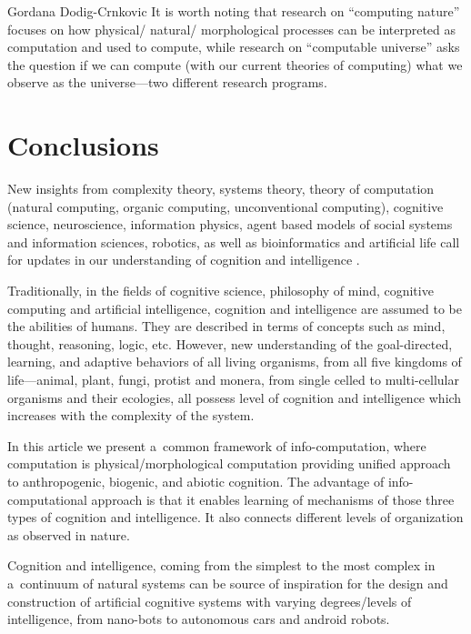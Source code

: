 \begin{artengenv}{Gordana Dodig-Crnkovic}
It is worth noting that research on ``computing nature'' focuses on how physical/ natural/ morphological processes can be interpreted as computation and used to compute, while research on ``computable universe'' asks the question if we can compute (with our current theories of computing) what we observe as the universe---two different research programs.

\section*{Conclusions}
New insights from complexity theory, systems theory, theory of computation (natural computing, organic computing, unconventional computing), cognitive science, neuroscience, information physics, agent based models of social systems and information sciences, robotics, as well as bioinformatics and artificial life call for updates in our understanding of cognition and intelligence
\parencites{dodig-crnkovic_dialogue_2011}{dodig-crnkovic_nature_2017}.

Traditionally, in the fields of cognitive science, philosophy of mind, cognitive computing and artificial intelligence, cognition and intelligence are assumed to be the abilities of humans. They are described in terms of concepts such as mind, thought, reasoning, logic, etc. However, new understanding of the goal-directed, learning, and adaptive behaviors of all living organisms, from all five kingdoms of life---animal, plant, fungi, protist and monera, from single celled to multi-cellular organisms and their ecologies, all possess level of cognition and intelligence which increases with the complexity of the system.

In this article we present a~common framework of info-computation, where computation is physical/morphological computation providing unified approach to anthropogenic, biogenic, and abiotic cognition. The advantage of info-computational approach is that it enables learning of mechanisms of those three types of cognition and intelligence. It also connects different levels of organization as observed in nature.

Cognition and intelligence, coming from the simplest to the most complex in a~continuum of natural systems can be source of inspiration for the design and construction of artificial cognitive systems with varying degrees/levels of intelligence, from nano-bots to autonomous cars and android robots.


\end{artengenv}
\label{gordana_stop}